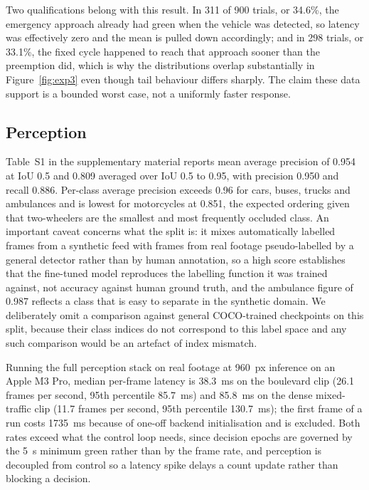\documentclass[journal]{IEEEtran}
\begin{document}
Two qualifications belong with this result. In 311 of 900 trials, or 34.6\%, the emergency approach
already had green when the vehicle was detected, so latency was effectively zero and the mean is pulled
down accordingly; and in 298 trials, or 33.1\%, the fixed cycle happened to reach that approach sooner
than the preemption did, which is why the distributions overlap substantially in
Figure~\ref{fig:exp3} even though tail behaviour differs sharply. The claim these data support is a
bounded worst case, not a uniformly faster response.

\subsection{Perception}
\label{sec:perception}





Table~S1 in the supplementary material reports mean average precision of 0.954 at IoU 0.5 and 0.809 averaged over
IoU 0.5 to 0.95, with precision 0.950 and recall 0.886. Per-class average precision exceeds 0.96 for
cars, buses, trucks and ambulances and is lowest for motorcycles at 0.851, the expected ordering given
that two-wheelers are the smallest and most frequently occluded class. An important caveat concerns what
the split is: it mixes automatically labelled frames from a synthetic feed with frames from real footage
pseudo-labelled by a general detector rather than by human annotation, so a high score establishes that
the fine-tuned model reproduces the labelling function it was trained against, not accuracy against human
ground truth, and the ambulance figure of 0.987 reflects a class that is easy to separate in the synthetic
domain. We deliberately omit a comparison against general COCO-trained checkpoints on this split, because
their class indices do not correspond to this label space and any such comparison would be an artefact of
index mismatch.

Running the full perception stack on real footage at 960~px inference on an Apple M3 Pro, median
per-frame latency is 38.3~ms on the boulevard clip (26.1 frames per second, 95th percentile 85.7~ms) and
85.8~ms on the dense mixed-traffic clip (11.7 frames per second, 95th percentile 130.7~ms); the first
frame of a run costs 1735~ms because of one-off backend initialisation and is excluded. Both rates exceed
what the control loop needs, since decision epochs are governed by the 5~s minimum green rather than by
the frame rate, and perception is decoupled from control so a latency spike delays a count update rather
than blocking a decision.
\end{document}
